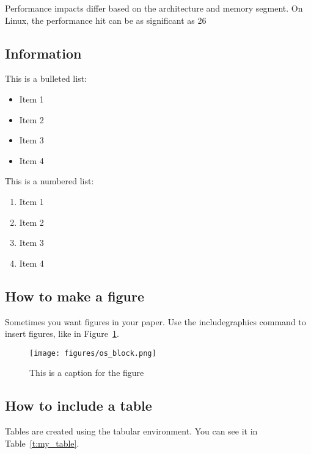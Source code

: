 Performance impacts differ based on the architecture and memory segment. On Linux, the performance hit can be as significant as 26%

\subsection{Information}

This is a bulleted list:
\begin{itemize}
\item Item 1
\item Item 2
\item Item 3
\item Item 4
\end{itemize}

This is a numbered list:
\begin{enumerate}
\item Item 1
\item Item 2
\item Item 3
\item Item 4
\end{enumerate}

\subsection{How to make a figure}
Sometimes you want figures in your paper.
Use the includegraphics command to insert figures, like in Figure~\ref{f:os_block}.

\begin{figure}
\centering %
\texttt{[image: figures/os\_block.png]}
\caption{This is a caption for the figure}
\label{f:os_block}
\end{figure}

\subsection{How to include a table}
Tables are created using the tabular environment.
You can see it in Table~\ref{t:my_table}.

